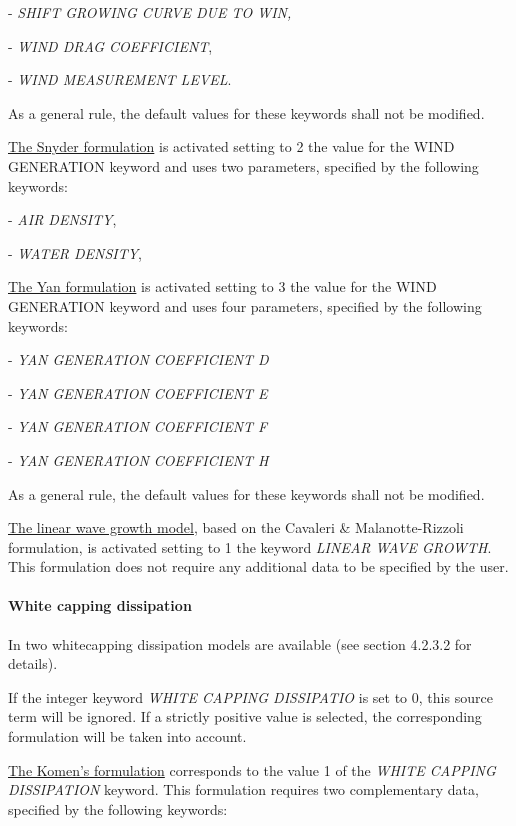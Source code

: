 - \textit{SHIFT GROWING CURVE DUE TO WIN,} 

- \textit{WIND DRAG COEFFICIENT},  

- \textit{WIND MEASUREMENT LEVEL}.  

  \textit{}

As a general rule, the default values for these keywords shall not be modified.

\underline{ The Snyder formulation} is activated setting to 2 the value for the WIND GENERATION keyword and uses two parameters,
specified by the following keywords:   

- \textit{AIR DENSITY},   

- \textit{WATER DENSITY},

   \textit{}

   \underline{ The Yan formulation} is activated setting to 3 the value for the WIND GENERATION keyword and uses four parameters,
   specified by the following keywords:   

- \textit{YAN GENERATION COEFFICIENT D}  

- \textit{YAN GENERATION COEFFICIENT E} 

- \textit{YAN GENERATION COEFFICIENT F} 

- \textit{YAN GENERATION COEFFICIENT H}

  \textit{}

As a general rule, the default values for these keywords shall not be modified.

\underline{  The linear wave growth model}, based on the Cavaleri \& Malanotte-Rizzoli formulation, is activated setting to 1 the
keyword \textit{LINEAR WAVE GROWTH}. This formulation does not require any additional data to be specified by the user.


\paragraph{ White capping dissipation}

 In \tomawac two whitecapping dissipation models are available (see section 4.2.3.2 for details).

 If the integer keyword \textit{WHITE CAPPING DISSIPATIO} is set to 0, this source term will be ignored. If a strictly positive value
 is selected, the corresponding formulation will be taken into account.

 \underline{  The Komen's formulation} corresponds to the value 1 of the \textit{WHITE CAPPING DISSIPATION} keyword. This formulation requires two complementary data, specified by the following keywords:   

